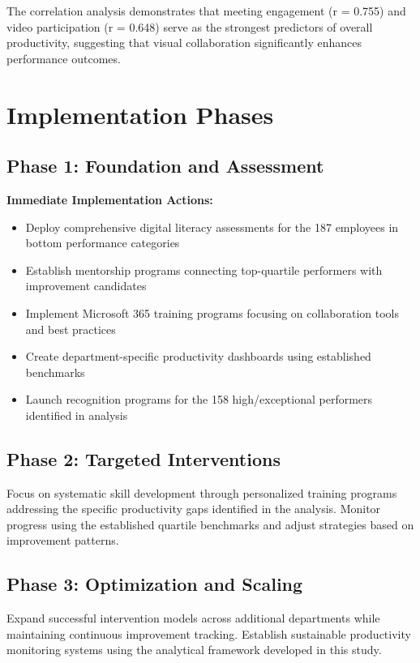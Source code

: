 \documentclass[12pt,a4paper]{article}
\begin{document}
The correlation analysis demonstrates that meeting engagement (r = 0.755) and video participation (r = 0.648) serve as the strongest predictors of overall productivity, suggesting that visual collaboration significantly enhances performance outcomes.

\section{Implementation Phases}

\subsection{Phase 1: Foundation and Assessment}

\begin{featurebox}
\textbf{Immediate Implementation Actions:}
\begin{itemize}
    \item Deploy comprehensive digital literacy assessments for the 187 employees in bottom performance categories
    \item Establish mentorship programs connecting top-quartile performers with improvement candidates
    \item Implement Microsoft 365 training programs focusing on collaboration tools and best practices
    \item Create department-specific productivity dashboards using established benchmarks
    \item Launch recognition programs for the 158 high/exceptional performers identified in analysis
\end{itemize}
\end{featurebox}

\subsection{Phase 2: Targeted Interventions}

Focus on systematic skill development through personalized training programs addressing the specific productivity gaps identified in the analysis. Monitor progress using the established quartile benchmarks and adjust strategies based on improvement patterns.

\subsection{Phase 3: Optimization and Scaling }

Expand successful intervention models across additional departments while maintaining continuous improvement tracking. Establish sustainable productivity monitoring systems using the analytical framework developed in this study.
\end{document}
